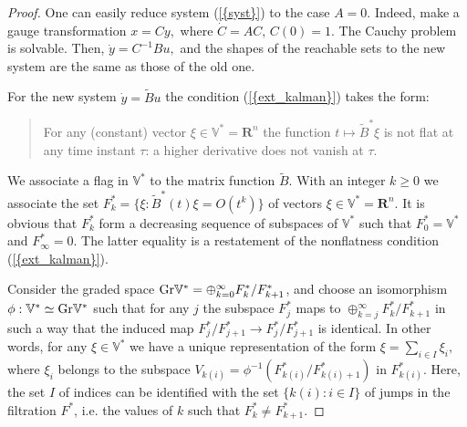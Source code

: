 \documentclass[final]{siamltex}
\begin{document}
\begin{proof}
One can easily reduce system {(\ref{{syst}})} to the case $A=0$. Indeed, make a gauge transformation $x=Cy,$ where $\dot
C=AC,\,C(0)=1.$ The Cauchy problem is solvable. Then, $\dot y=C^{-1}Bu,$ and the shapes of the reachable sets to the new
system are the same as those of the old one.

For the new system $\dot y={\widetilde B}u$ the condition {(\ref{{ext_kalman}})} takes the form:
\begin{quote}
For any (constant) vector  $\xi\in\mathbb{V}^*={{\mathbf R}}^n$ the function  $t\mapsto{\widetilde B}^*\xi$ is
not flat at any time instant $\tau$: a higher derivative does not vanish at $\tau$.
\end{quote}

We associate a flag in $\mathbb{V}^*$ to the matrix function ${\widetilde B}$. With an integer
$k\geq0$ we associate the set $F_k^*=\{\xi:{\widetilde B}^*(t)\xi=O(t^k)\}$ of vectors
$\xi\in\mathbb{V}^*={{\mathbf R}}^n$. It is obvious that $F_k^*$ form a decreasing sequence of subspaces of
$\mathbb{V}^*$ such that $F_0^*=\mathbb{V}^*$ and $F_\infty^*=0.$ The latter equality is a
restatement of the nonflatness condition {(\ref{{ext_kalman}})}.

Consider the graded space ${\mathop{\rm Gr}\nolimits}\mathbb{V}^*=\oplus_{k=0}^\infty F_{k}^*/F_{k+1}^*$, and choose an
isomorphism $\phi:\mathbb{V}^*\simeq{\mathop{\rm Gr}\nolimits}\mathbb{V}^*$ such that for any $j$ the subspace $F_j^*$ maps
to $\oplus_{k=j}^{\infty} F_{k}^*/F_{k+1}^*$ in such a way that the induced map $F_j^*/F_{j+1}^*\to
F_j^*/F_{j+1}^*$ is identical. In other words, for any $\xi\in \mathbb{V}^*$  we have a unique
representation of the form $\xi=\sum_{i\in I} \xi_i,$ where $\xi_i
$ belongs to the subspace $V_{k(i)}=\phi^{-1}\left(F_{k(i)}^*/F_{k(i)+1}^*\right)$ in $F_{k(i)}^*$.
Here, the set $I$ of indices can be identified with the set $\{k(i): i\in I\}$ of jumps in the
filtration $F^*$, i.e. the values of $k$ such that $F_{k}^*\neq F_{k+1}^*$.


\end{proof}
\end{document}
